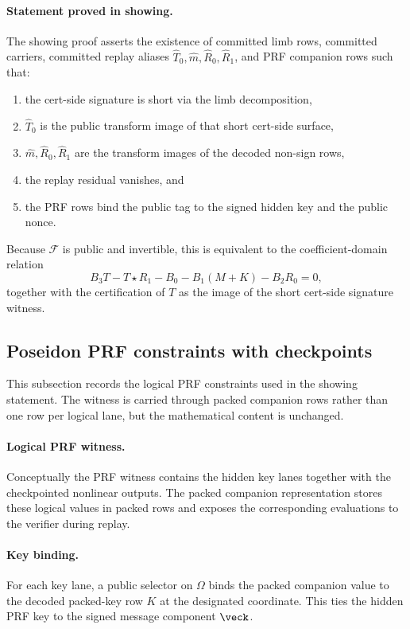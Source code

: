 \paragraph{Statement proved in showing.}
The showing proof asserts the existence of committed limb rows, committed
carriers, committed replay aliases
\(\widehat T_0,\widehat m,\widehat R_0,\widehat R_1\), and PRF companion rows
such that:
\begin{enumerate}[leftmargin=1.25em]
  \item the cert-side signature is short via the limb decomposition,
  \item \(\widehat T_0\) is the public transform image of that short
  cert-side surface,
  \item \(\widehat m,\widehat R_0,\widehat R_1\) are the transform images of
  the decoded non-sign rows,
  \item the replay residual vanishes, and
  \item the PRF rows bind the public tag to the signed hidden key and the
  public nonce.
\end{enumerate}
Because \(\mathcal F\) is public and invertible, this is equivalent to the
coefficient-domain relation
\[
  B_3T - T\star R_1 - B_0 - B_1(M+K) - B_2R_0 = 0,
\]
together with the certification of \(T\) as the image of the short
cert-side signature witness.

\subsection{Poseidon PRF constraints with checkpoints}
\label{subsec:prf-checkpointed}
This subsection records the logical PRF constraints used in the showing
statement. The witness is carried through packed companion rows rather than one
row per logical lane, but the mathematical content is unchanged.

\paragraph{Logical PRF witness.}
Conceptually the PRF witness contains the hidden key lanes together with the
checkpointed nonlinear outputs. The packed companion representation stores these
logical values in packed rows and exposes the corresponding evaluations to the
verifier during replay.

\paragraph{Key binding.}
For each key lane, a public selector on \(\Omega\) binds the packed companion
value to the decoded packed-key row \(K\) at the designated coordinate. This
ties the hidden PRF key to the signed message component \(\veck\).

